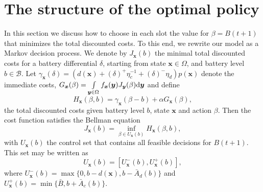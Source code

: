 \documentclass[journal]{IEEEtran}
\newcommand{\Amax}{\bar{A}}
\newcommand{\Bmax}{\bar{B}}
\newcommand{\Bu}{\mathcal{B}}
\newcommand{\bfx}{\boldsymbol x}
\newcommand{\bfy}{\boldsymbol y}
\newcommand{\Uright}{U_{\bfx}^+(b)}
\newcommand{\Uleft}{U_{\bfx}^-(b)}
\newcommand\1{\mathbf{1}}
\begin{document}
\section{The structure of the optimal policy}\label{sec:structure}
In this section we discuss how to choose in each slot the value for $\beta = B(t+1)$ that minimizes the total discounted costs. To this end, we rewrite our model as a Markov decision process. We denote by $J_{\bfx}(b)$ the minimal total discounted costs for a battery differential $\delta$, starting from state $\bfx \in \Omega$, and battery level $b \in \Bu$. Let $\gamma_{\bfx}(\delta) = (d(\bfx) + (\delta)^+ \eta_c^{-1} + (\delta)^- \eta_d) p(\bfx)$ denote the immediate costs, $G_{\bfx}(\beta) = \int\limits_{\bfy \in \Omega} f_{\bfx}(\bfy) J_{\bfy}(\beta){\rm d}\bfy$ and define
\begin{equation*}
H_{\bfx}(\beta,b) = \gamma_{\bfx}(\beta - b) + \alpha G_{\bfx}(\beta),
\end{equation*}
the total discounted costs given battery level $b$, state $\bfx$ and action $\beta$. Then the cost function satisfies the Bellman equation
\begin{equation}\label{eqn:bellman}
J_{\bfx}(b) = \inf_{\beta \in U_{\bfx}(b)}H_{\bfx}(\beta,b),
\end{equation}
with $U_{\bfx}(b)$ the control set that contains all feasible decisions for $B(t+1)$. This set may be written as
\begin{equation*}
U_{\bfx}(b)  = [\Uleft,\Uright],
\end{equation*}
where $\Uleft = \max\{0,b - d(\bfx),b-\Amax_d(b)\}$ and $\Uright = \min\{\Bmax, b + \Amax_c(b)\}$.
\end{document}
